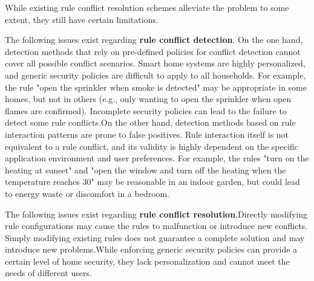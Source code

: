 While existing rule conflict resolution schemes alleviate the problem to some extent, they still have certain limitations.

The following issues exist regarding \textbf{rule conflict detection}. On the one hand, detection methods\cite{celik2018soteria,celik2019iotguard,ding2021iotsafe} that rely on pre-defined policies for conflict detection cannot cover all possible conflict scenarios. Smart home systems are highly personalized, and generic security policies are difficult to apply to all households. For example, the rule "open the sprinkler when smoke is detected" may be appropriate in some homes, but not in others (e.g., only wanting to open the sprinkler when open flames are confirmed). Incomplete security policies can lead to the failure to detect some rule conflicts.On the other hand, detection methods\cite{chi2020cross,chi2023detecting,celik2019iotguard,alhanahnah2022iotcom} based on rule interaction patterns are prone to false positives. Rule interaction itself is not equivalent to a rule conflict, and its validity is highly dependent on the specific application environment and user preferences. For example, the rules "turn on the heating at sunset" and "open the window and turn off the heating when the temperature reaches 30\celsius" may be reasonable in an indoor garden, but could lead to energy waste or discomfort in a bedroom.


The following issues exist regarding \textbf{rule conflict resolution}.Directly modifying rule configurations may cause the rules to malfunction or introduce new conflicts. Simply modifying existing rules does not guarantee a complete solution and may introduce new problems\cite{celik2018soteria,chen2019multi,chi2020cross,ding2018safety,hsu2019safechain,wang2019charting}.While enforcing generic security policies can provide a certain level of home security, they lack personalization and cannot meet the needs of different users\cite{celik2019iotguard,ding2021iotsafe}.


